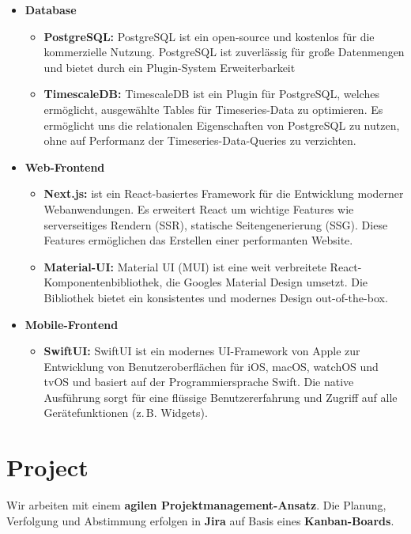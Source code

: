 \documentclass{article}
\begin{document}
\begin{itemize}
  \item \textbf{Database}
    \begin{itemize}
      \item \textbf{PostgreSQL:} PostgreSQL ist ein open-source und kostenlos für die kommerzielle Nutzung. PostgreSQL ist zuverlässig für große Datenmengen und bietet durch ein Plugin-System Erweiterbarkeit
      \item \textbf{TimescaleDB:} TimescaleDB ist ein Plugin für PostgreSQL, welches ermöglicht, ausgewählte Tables für Timeseries-Data zu optimieren. Es ermöglicht uns die relationalen Eigenschaften von PostgreSQL zu nutzen, ohne auf Performanz der Timeseries-Data-Queries zu verzichten.
    \end{itemize}

  \item \textbf{Web-Frontend}
    \begin{itemize}
      \item \textbf{Next.js:} ist ein React-basiertes Framework für die Entwicklung moderner Webanwendungen. Es erweitert React um wichtige Features wie serverseitiges Rendern (SSR), statische Seitengenerierung (SSG). Diese Features ermöglichen das Erstellen einer performanten Website.
      \item \textbf{Material-UI:} Material UI (MUI) ist eine weit verbreitete React-Komponentenbibliothek, die Googles Material Design umsetzt. Die Bibliothek bietet ein konsistentes und modernes Design out-of-the-box.
    \end{itemize}

  \item \textbf{Mobile-Frontend}
    \begin{itemize}
      \item \textbf{SwiftUI:} SwiftUI ist ein modernes UI-Framework von Apple zur Entwicklung von Benutzeroberflächen für iOS, macOS, watchOS und tvOS und basiert auf der Programmiersprache Swift. Die native Ausführung sorgt für eine flüssige Benutzererfahrung und Zugriff auf alle Gerätefunktionen (z.\,B. Widgets).
    \end{itemize}
\end{itemize}



\section{Project}
Wir arbeiten mit einem \textbf{agilen Projektmanagement-Ansatz}. Die Planung, Verfolgung und Abstimmung erfolgen in \textbf{Jira} auf Basis eines \textbf{Kanban-Boards}.
\end{document}
